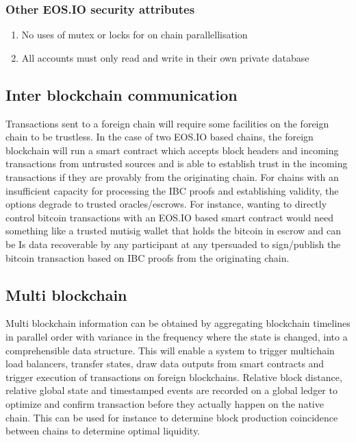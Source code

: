 \documentclass[]{article}
\begin{document}
		\subsubsection{Other EOS.IO security attributes}
		\begin{enumerate}
		\item No uses of mutex or locks for on chain parallellisation
		\item All accounts must only read and write in their own private database
		\end{enumerate}
		
	\subsection{Inter blockchain communication}
	
	Transactions sent to a foreign chain will require some facilities on the foreign chain to be trustless. 
	In the case of two EOS.IO based chains, the foreign blockchain will run a smart contract which accepts block headers and incoming transactions from untrusted sources and is able to establish trust in the incoming transactions if they are provably from the originating chain. 
	For chains with an insufficient capacity for processing the IBC proofs and establishing validity, the options degrade to trusted oracles/escrows.
	For instance, wanting to directly control bitcoin transactions with an EOS.IO based smart contract would need something like a trusted mutisig wallet that holds the bitcoin in escrow and can be 	Is data recoverable by any participant at any tpersuaded to sign/publish the bitcoin transaction based on IBC proofs from the originating chain.\cite{3}
	
	
	\subsection{Multi blockchain}
	Multi blockchain information can be obtained by aggregating blockchain timelines in parallel order with variance in the frequency where the state is changed, into a comprehensible data structure.
	This will enable a system to trigger multichain load balancers, transfer states, draw data outputs from smart contracts and trigger execution of transactions on foreign blockchains. 
	Relative block distance, relative global state and timestamped events are recorded on a global ledger to optimize and confirm transaction before they actually happen on the native chain.
	This can be used for instance to determine block production coincidence between chains to determine optimal liquidity.\cite{20}
	
\end{document}
